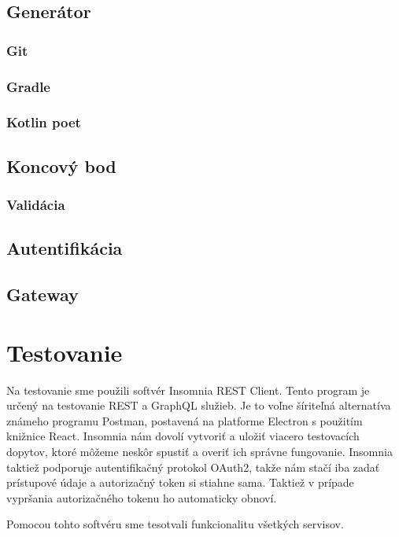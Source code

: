   

\subsection{Generátor} 
\subsubsection{Git}
\subsubsection{Gradle}
\subsubsection{Kotlin poet}


\subsection{Koncový bod}
\subsubsection{Validácia}

\subsection{Autentifikácia}
 
\subsection{Gateway} 




  

 

  

\section{Testovanie} 

 Na testovanie sme použili softvér Insomnia REST Client\cite{insomnia}. Tento program je určený na testovanie REST a GraphQL služieb. Je to voľne šíriteľná alternatíva známeho programu Postman, postavená na platforme Electron s použitím knižnice React. Insomnia nám dovolí vytvoriť a uložiť viacero testovacích dopytov, ktoré môžeme neskôr spustiť a overiť ich správne fungovanie. Insomnia taktiež podporuje autentifikačný protokol OAuth2, takže nám stačí iba zadať prístupové údaje a autorizačný token si stiahne sama. Taktiež v prípade vypršania autorizačného tokenu ho automaticky obnoví. 
 
 Pomocou tohto softvéru sme tesotvali funkcionalitu všetkých servisov.

